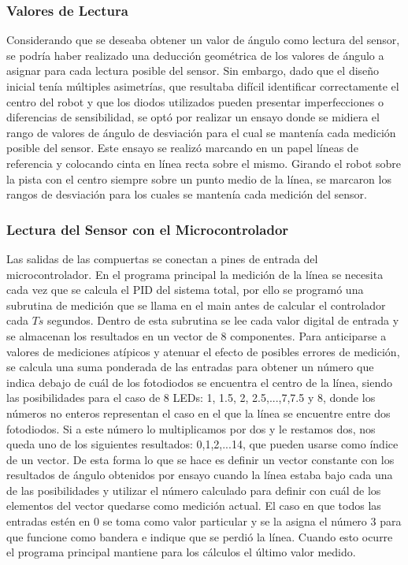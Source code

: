 \documentclass[10pt,conference,a4paper,onecolumn]{article}%
\begin{document}
\subsubsection{Valores de Lectura}
Considerando que se deseaba obtener un valor de ángulo como lectura del sensor, se podría haber realizado una deducción geométrica de los valores de ángulo a asignar para cada lectura posible del sensor. Sin embargo, dado que el diseño inicial tenía múltiples asimetrías, que resultaba difícil identificar correctamente el centro del robot y que los diodos utilizados pueden presentar imperfecciones o diferencias de sensibilidad, se optó por realizar un ensayo donde se midiera el rango de valores de ángulo de desviación para el cual se mantenía cada medición posible del sensor. Este ensayo se realizó marcando en un papel líneas de referencia y colocando cinta en línea recta sobre el mismo. Girando el robot sobre la pista con el centro siempre sobre un punto medio de la línea, se marcaron los rangos de desviación para los cuales se mantenía cada medición del sensor.
\subsubsection{Lectura del Sensor con el Microcontrolador}
Las salidas de las compuertas se conectan a pines de entrada del microcontrolador. En el programa principal la medición de la línea se necesita cada vez que se calcula el PID del sistema total, por ello se programó una subrutina de medición que se llama en el main antes de calcular el controlador cada $Ts$ segundos. Dentro de esta subrutina se lee cada valor digital de entrada y se almacenan los resultados en un vector de 8 componentes. Para anticiparse a valores de mediciones atípicos y atenuar el efecto de posibles errores de medición, se calcula una suma ponderada de las entradas para obtener un número que indica debajo de cuál de los fotodiodos se encuentra el centro de la línea, siendo las posibilidades para el caso de 8 LEDs: 1, 1.5, 2, 2.5,...,7,7.5 y 8, donde los números no enteros representan el caso en el que la línea se encuentre entre dos fotodiodos. Si a este número lo multiplicamos por dos y le restamos dos, nos queda uno de los siguientes resultados: 0,1,2,...14, que pueden usarse como índice de un vector. De esta forma lo que se hace es definir un vector constante con los resultados de ángulo obtenidos por ensayo cuando la línea estaba bajo cada una de las posibilidades y utilizar el número calculado para definir con cuál de los elementos del vector quedarse como medición actual. El caso en que todos
las entradas estén en 0 se toma como valor particular y se la asigna el número 3 para que funcione como bandera e indique que se perdió la línea. Cuando esto ocurre el programa principal mantiene para los cálculos el último valor medido.
\end{document}
